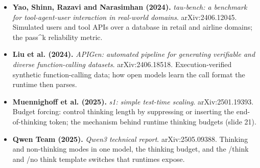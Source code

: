 \documentclass[11pt,letterpaper]{article}
\begin{document}
\begin{itemize}[leftmargin=1.2em,itemsep=3pt]
\item \textbf{Yao, Shinn, Razavi and Narasimhan (2024).} \textit{tau-bench: a benchmark for tool-agent-user interaction in real-world domains}. arXiv:2406.12045. Simulated users and tool APIs over a database in retail and airline domains; the pass\^{}k reliability metric.
\item \textbf{Liu et al. (2024).} \textit{APIGen: automated pipeline for generating verifiable and diverse function-calling datasets}. arXiv:2406.18518. Execution-verified synthetic function-calling data; how open models learn the call format the runtime then parses.
\item \textbf{Muennighoff et al. (2025).} \textit{s1: simple test-time scaling}. arXiv:2501.19393. Budget forcing: control thinking length by suppressing or inserting the end-of-thinking token; the mechanism behind runtime thinking budgets (slide 21).
\item \textbf{Qwen Team (2025).} \textit{Qwen3 technical report}. arXiv:2505.09388. Thinking and non-thinking modes in one model, the thinking budget, and the /think and /no think template switches that runtimes expose.
\end{itemize}
\end{document}

